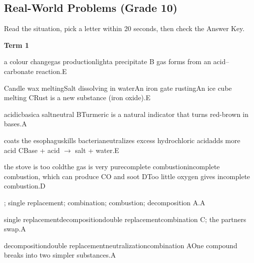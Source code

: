 \subsection{Real-World Problems (Grade 10)}
{\small Read the situation, pick a letter within 20 seconds, then check the Answer Key.\par}
\begin{gradebody}

\textbf{Term 1}

{a colour change}{gas production}{light}{a precipitate}
{B}{ gas forms from an acid--carbonate reaction.}{E}

{Candle wax melting}{Salt dissolving in water}{An iron gate rusting}{An ice cube melting}
{C}{Rust is a new substance (iron oxide).}{E}

{acidic}{basic}{a salt}{neutral}
{B}{Turmeric is a natural indicator that turns red-brown in bases.}{A}

{coats the esophagus}{kills bacteria}{neutralizes excess hydrochloric acid}{adds more acid}
{C}{Base + acid $\rightarrow$ salt + water.}{E}

{the stove is too cold}{the gas is very pure}{complete combustion}{incomplete combustion, which can produce CO and soot}
{D}{Too little oxygen gives incomplete combustion.}{D}

{; single replacement}{; combination}{; combustion}{; decomposition}
{A}{.}{A}

{single replacement}{decomposition}{double replacement}{combination}
{C}{; the partners swap.}{A}

{decomposition}{double replacement}{neutralization}{combination}
{A}{One compound breaks into two simpler substances.}{A}


\end{gradebody}
